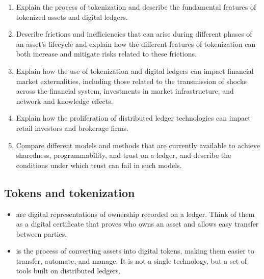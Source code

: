 
\begin{cikeybox}[title={The five objectives, in the spine's own words}]
\begin{enumerate}[label=\textbf{\alph*.}]
\item Explain the process of tokenization and describe the fundamental features of tokenized
assets and digital ledgers.
\item Describe frictions and inefficiencies that can arise during different phases of an
asset's lifecycle and explain how the different features of tokenization can both increase and
mitigate risks related to these frictions.
\item Explain how the use of tokenization and digital ledgers can impact financial market
externalities, including those related to the transmission of shocks across the financial
system, investments in market infrastructure, and network and knowledge effects.
\item Explain how the proliferation of distributed ledger technologies can impact retail
investors and brokerage firms.
\item Compare different models and methods that are currently available to achieve sharedness,
programmability, and trust on a ledger, and describe the conditions under which trust can fail
in such models.
\end{enumerate}
\end{cikeybox}


\subsection*{Tokens and tokenization}

\begin{itemize}
\item {} are digital representations of ownership recorded on a ledger. Think of
them as a digital certificate that proves who owns an asset and allows easy transfer between
parties.
\item {} is the process of converting assets into digital tokens, making them
easier to transfer, automate, and manage. It is not a single technology, but a set of tools
built on distributed ledgers.
\end{itemize}

